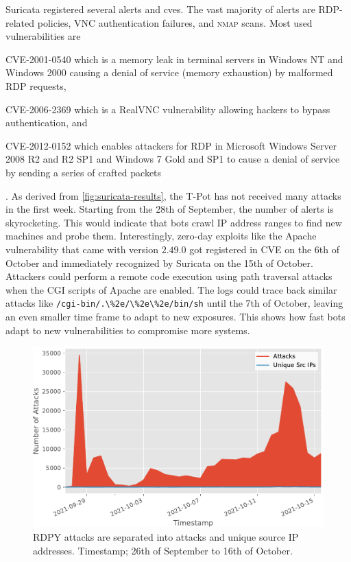 Suricata registered several alerts and \acsp{cve}.
The vast majority of alerts are RDP-related policies, VNC authentication failures, and \textsc{nmap} scans.
Most used vulnerabilities are
\begin{enumerate*}[label=(\roman*)]
    \item CVE-2001-0540\cite{CVE-2001-0540} which is a memory leak in terminal servers in Windows NT and Windows 2000 causing a denial of service (memory exhaustion) by malformed RDP requests,
    \item CVE-2006-2369\cite{CVE-2006-2369} which is a RealVNC vulnerability allowing hackers to bypass authentication, and
    \item CVE-2012-0152\cite{CVE-2012-0152} which enables attackers for RDP in Microsoft Windows Server 2008 R2 and R2 SP1 and Windows 7 Gold and SP1 to cause a denial of service by sending a series of crafted packets
\end{enumerate*}.
As derived from \autoref{fig:suricata-results}, the T-Pot has not received many attacks in the first week.
Starting from the 28th of September, the number of alerts is skyrocketing.
This would indicate that bots crawl IP address ranges to find new machines and probe them.
Interestingly, zero-day exploits like the Apache vulnerability \cite{CVE-2021-42013} that came with version $2.49.0$ got registered in CVE on the 6th of October and immediately recognized by Suricata on the 15th of October.
Attackers could perform a remote code execution using path traversal attacks when the CGI scripts of Apache are enabled.
The logs could trace back similar attacks like \verb|/cgi-bin/.\%2e/\%2e\%2e/bin/sh| until the 7th of October, leaving an even smaller time frame to adapt to new exposures.
This shows how fast bots adapt to new vulnerabilities to compromise more systems.

\begin{figure}[ht]
    \centering
    \includegraphics[width=\textwidth]{figures/tpot-rdpy-port.pdf}
    \caption[RDPY results of T-Pot]{
        RDPY attacks are separated into attacks and unique source IP addresses.
        Timestamp; 26th of September to 16th of October.
    }
    \label{fig:rdpy-results}
\end{figure}


